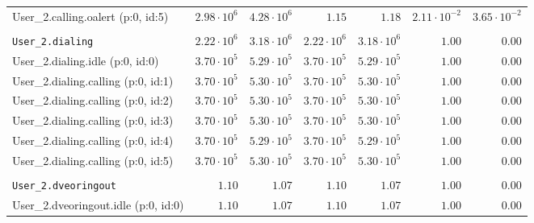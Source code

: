 \begin{table}[htbp]
{\begin{tabular}{lrrrrrr}
\hspace{3mm}User\_2.calling.oalert (p:0, id:5)        &  $2.98 \cdot 10^{6}$ &  $4.28 \cdot 10^{6}$ &               $1.15$ &               $1.18$ & $2.11 \cdot 10^{-2}$ & $3.65 \cdot 10^{-2}$ \\
\\[-8pt]\texttt{User\_2.dialing}                      &  $2.22 \cdot 10^{6}$ &  $3.18 \cdot 10^{6}$ &  $2.22 \cdot 10^{6}$ &  $3.18 \cdot 10^{6}$ &               $1.00$ &               $0.00$ \\
\hspace{3mm}User\_2.dialing.idle (p:0, id:0)          &  $3.70 \cdot 10^{5}$ &  $5.29 \cdot 10^{5}$ &  $3.70 \cdot 10^{5}$ &  $5.29 \cdot 10^{5}$ &               $1.00$ &               $0.00$ \\
\hspace{3mm}User\_2.dialing.calling (p:0, id:1)       &  $3.70 \cdot 10^{5}$ &  $5.30 \cdot 10^{5}$ &  $3.70 \cdot 10^{5}$ &  $5.30 \cdot 10^{5}$ &               $1.00$ &               $0.00$ \\
\hspace{3mm}User\_2.dialing.calling (p:0, id:2)       &  $3.70 \cdot 10^{5}$ &  $5.30 \cdot 10^{5}$ &  $3.70 \cdot 10^{5}$ &  $5.30 \cdot 10^{5}$ &               $1.00$ &               $0.00$ \\
\hspace{3mm}User\_2.dialing.calling (p:0, id:3)       &  $3.70 \cdot 10^{5}$ &  $5.30 \cdot 10^{5}$ &  $3.70 \cdot 10^{5}$ &  $5.30 \cdot 10^{5}$ &               $1.00$ &               $0.00$ \\
\hspace{3mm}User\_2.dialing.calling (p:0, id:4)       &  $3.70 \cdot 10^{5}$ &  $5.29 \cdot 10^{5}$ &  $3.70 \cdot 10^{5}$ &  $5.29 \cdot 10^{5}$ &               $1.00$ &               $0.00$ \\
\hspace{3mm}User\_2.dialing.calling (p:0, id:5)       &  $3.70 \cdot 10^{5}$ &  $5.30 \cdot 10^{5}$ &  $3.70 \cdot 10^{5}$ &  $5.30 \cdot 10^{5}$ &               $1.00$ &               $0.00$ \\
\\[-8pt]\texttt{User\_2.dveoringout}                  &               $1.10$ &               $1.07$ &               $1.10$ &               $1.07$ &               $1.00$ &               $0.00$ \\
\hspace{3mm}User\_2.dveoringout.idle (p:0, id:0)      &               $1.10$ &               $1.07$ &               $1.10$ &               $1.07$ &               $1.00$ &               $0.00$ \\

\end{tabular}}
\end{table}
